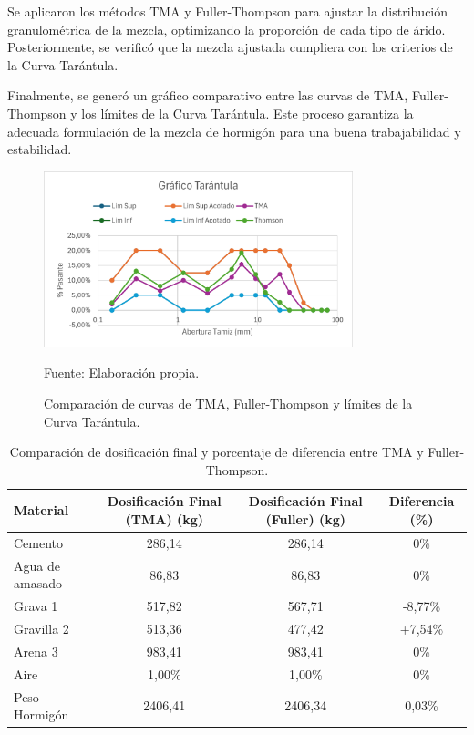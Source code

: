 Se aplicaron los métodos TMA y Fuller-Thompson para ajustar la distribución granulométrica de la mezcla, optimizando la proporción de cada tipo de árido. Posteriormente, se verificó que la mezcla ajustada cumpliera con los criterios de la Curva Tarántula.

Finalmente, se generó un gráfico comparativo entre las curvas de TMA, Fuller-Thompson y los límites de la Curva Tarántula. Este proceso garantiza la adecuada formulación de la mezcla de hormigón para una buena trabajabilidad y estabilidad.

\begin{figure}[H]
    \centering
    \includegraphics[width=0.8\textwidth]{GRAFICOS/tarantula.png}
    \caption{Comparación de curvas de TMA, Fuller-Thompson y límites de la Curva Tarántula.}
    \label{fig:curva_tarantula}
    Fuente: Elaboración propia.
\end{figure}

\begin{table}[H]
\centering
\caption{Comparación de dosificación final y porcentaje de diferencia entre TMA y Fuller-Thompson.}
\label{tab:comparacion-dosificacion}
\begin{tabular}{|l|c|c|c|}
\hline
\textbf{Material} & \textbf{Dosificación Final (TMA) (kg)} & \textbf{Dosificación Final (Fuller) (kg)} & \textbf{Diferencia (\%)} \\ \hline
Cemento           & 286,14                               & 286,14                                & 0\%                     \\ \hline
Agua de amasado   & 86,83                                & 86,83                                 & 0\%                     \\ \hline
Grava 1           & 517,82                               & 567,71                                & -8,77\%                 \\ \hline
Gravilla 2        & 513,36                               & 477,42                                & +7,54\%                 \\ \hline
Arena 3           & 983,41                               & 983,41                                & 0\%                     \\ \hline
Aire              & 1,00\%                               & 1,00\%                                & 0\%                     \\ \hline
Peso Hormigón     & 2406,41                              & 2406,34                               & 0,03\%                  \\ \hline
\end{tabular}
\end{table}

